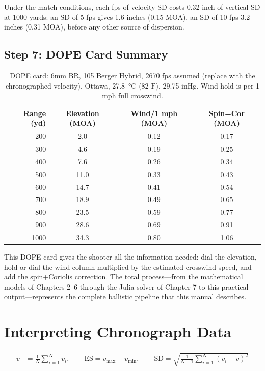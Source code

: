\documentclass[11pt,twoside,openright]{report}
\newcommand{\degF}{\ensuremath{{}^{\circ}\mathrm{F}}}
\begin{document}
Under the match conditions, each fps of velocity SD costs 0.32 inch of vertical SD at 1000 yards: an SD of 5 fps gives 1.6 inches (0.15 MOA), an SD of 10 fps 3.2 inches (0.31 MOA), before any other source of dispersion.

\subsection{Step 7: DOPE Card Summary}

\begin{table}[H]
\centering
\caption{DOPE card: 6mm BR, 105 Berger Hybrid, 2670 fps assumed (replace with the chronographed velocity). Ottawa, \protect\SI{27.8}{\celsius} (82\protect\degF), 29.75 inHg. Wind hold is per 1 mph full crosswind.}
\label{tab:6br_dope}
\begin{tabular}{@{}rccc@{}}
\toprule
\textbf{Range (yd)} & \textbf{Elevation (MOA)} & \textbf{Wind/1 mph (MOA)} & \textbf{Spin+Cor (MOA)} \\
\midrule
200 &  2.0 & 0.12 & 0.17 \\
300 &  4.6 & 0.19 & 0.25 \\
400 &  7.6 & 0.26 & 0.34 \\
500 & 11.0 & 0.33 & 0.43 \\
600 & 14.7 & 0.41 & 0.54 \\
700 & 18.9 & 0.49 & 0.65 \\
800 & 23.5 & 0.59 & 0.77 \\
900 & 28.6 & 0.69 & 0.91 \\
1000 & 34.3 & 0.80 & 1.06 \\
\bottomrule
\end{tabular}
\end{table}

This DOPE card gives the shooter all the information needed: dial the elevation, hold or dial the wind column multiplied by the estimated crosswind speed, and add the spin+Coriolis correction. The total process---from the mathematical models of Chapters 2--6 through the Julia solver of Chapter 7 to this practical output---represents the complete ballistic pipeline that this manual describes.

\section{Interpreting Chronograph Data}

\begin{align}
  \bar{v} &= \frac{1}{N}\sum_{i=1}^N v_i, \qquad
  \text{ES} = v_{\max} - v_{\min}, \qquad
  \text{SD} = \sqrt{\frac{1}{N-1}\sum_{i=1}^N (v_i - \bar{v})^2}
\end{align}
\end{document}
